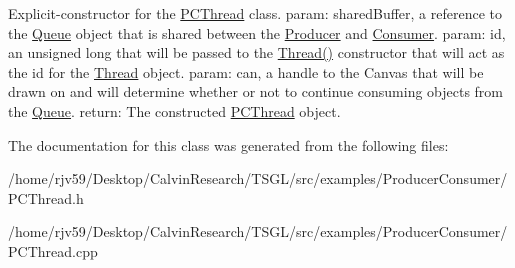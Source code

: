 Explicit-\/constructor for the \hyperlink{class_p_c_thread}{P\+C\+Thread} class. param\+: shared\+Buffer, a reference to the \hyperlink{class_queue}{Queue} object that is shared between the \hyperlink{class_producer}{Producer} and \hyperlink{class_consumer}{Consumer}. param\+: id, an unsigned long that will be passed to the \hyperlink{class_thread_a95c703fb8f2f27cb64f475a8c940864a}{Thread()} constructor that will act as the id for the \hyperlink{class_thread}{Thread} object. param\+: can, a handle to the Canvas that will be drawn on and will determine whether or not to continue consuming objects from the \hyperlink{class_queue}{Queue}. return\+: The constructed \hyperlink{class_p_c_thread}{P\+C\+Thread} object. 

The documentation for this class was generated from the following files\+:\begin{DoxyCompactItemize}
\item 
/home/rjv59/\+Desktop/\+Calvin\+Research/\+T\+S\+G\+L/src/examples/\+Producer\+Consumer/P\+C\+Thread.\+h\item 
/home/rjv59/\+Desktop/\+Calvin\+Research/\+T\+S\+G\+L/src/examples/\+Producer\+Consumer/P\+C\+Thread.\+cpp\end{DoxyCompactItemize}
